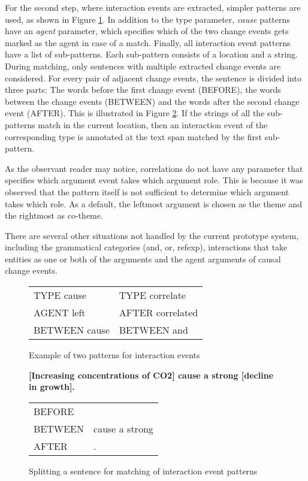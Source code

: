For the second step, where interaction events are extracted, simpler patterns are used, as shown in Figure \ref{iep_exmpl}. In addition to the type parameter, \emph{cause} patterns have an \emph{agent} parameter, which specifies which of the two change events gets marked as the agent in case of a match. Finally, all interaction event patterns have a list of sub-patterns. Each sub-pattern consists of a location and a string. During matching, only sentences with multiple extracted change events are considered. For every pair of adjacent change events, the sentence is divided into three parts: The words before the first change event (BEFORE), the words between the change events (BETWEEN) and the words after the second change event (AFTER). This is illustrated in Figure \ref{iep_split}. If the strings of all the sub-patterns match in the current location, then an interaction event of the corresponding type is annotated at the text span matched by the first sub-pattern. 

As the observant reader may notice, correlations do not have any parameter that specifies which argument event takes which argument role. This is because it was observed that the pattern itself is not sufficient to determine which argument takes which role. As a default, the leftmost argument is chosen as the theme and the rightmost as co-theme.

There are several other situations not handled by the current prototype system, including the grammatical categories (and, or, refexp), interactions that take entities as one or both of the arguments and the agent arguments of causal change events.

\begin{figure}
\begin{center}
\begin{tabular}{  l  l  }
TYPE cause & TYPE correlate \\
AGENT left	& AFTER correlated \\
BETWEEN cause & BETWEEN and \\
\end{tabular}
\end{center}
\caption{Example of two patterns for interaction events}
\label{iep_exmpl}
\end{figure}

\begin{figure}
\begin{center}

\textbf{[Increasing concentrations of CO2] cause a strong [decline in growth].}

\begin{tabular}{  l  l  }
BEFORE & \\
BETWEEN & cause a strong \\
AFTER & . \\
\end{tabular}

\end{center}
\caption{Splitting a sentence for matching of interaction event patterns}
\label{iep_split}
\end{figure}

